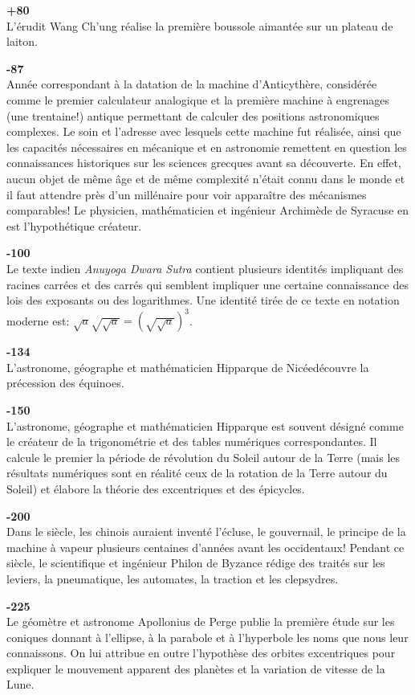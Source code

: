 \textbf{+80}\\
L'érudit Wang Ch'ung réalise la première boussole aimantée sur un plateau de laiton.

\textbf{-87}\\
Année correspondant à la datation de la machine d'Anticythère, considérée comme le premier calculateur analogique et la première machine à engrenages (une trentaine!) antique permettant de calculer des positions astronomiques complexes. Le soin et l'adresse avec lesquels cette machine fut réalisée, ainsi que les capacités nécessaires en mécanique et en astronomie remettent en question les connaissances historiques sur les sciences grecques avant sa découverte. En effet, aucun objet de même âge et de même complexité n'était connu dans le monde et il faut attendre près d'un millénaire pour voir apparaître des mécanismes comparables! Le physicien, mathématicien et ingénieur Archimède de Syracuse en est l'hypothétique créateur.

\textbf{-100}\\
Le texte indien \textit{Anuyoga Dwara Sutra} contient plusieurs identités impliquant des racines carrées et des carrés qui semblent impliquer une certaine connaissance des lois des exposants ou des logarithmes. Une identité tirée de ce texte en notation moderne est: $ \sqrt{a}\sqrt{\sqrt {a}} = (\sqrt{\sqrt{a}})^3$.

\textbf{-134}\\
L'astronome, géographe et mathématicien Hipparque de Nicéedécouvre la précession des équinoes.

\textbf{-150}\\
L'astronome, géographe et mathématicien Hipparque est souvent désigné comme le créateur de la trigonométrie et des tables numériques correspondantes. Il calcule le premier la période de révolution du Soleil autour de la Terre (mais les résultats numériques sont en réalité ceux de la rotation de la Terre autour du Soleil) et élabore la théorie des excentriques et des épicycles.

\textbf{-200}\\
Dans le siècle, les chinois auraient inventé l'écluse, le gouvernail, le principe de la machine à vapeur plusieurs centaines d'années avant les occidentaux! Pendant ce siècle, le scientifique et ingénieur Philon de Byzance rédige des traités sur les leviers, la pneumatique, les automates, la traction et les clepsydres.

\textbf{-225}\\
Le géomètre et astronome Apollonius de Perge publie la première étude sur les coniques donnant à l'ellipse, à la parabole et à l'hyperbole les noms que nous leur connaissons. On lui attribue en outre l'hypothèse des orbites excentriques pour expliquer le mouvement apparent des planètes et la variation de vitesse de la Lune.


